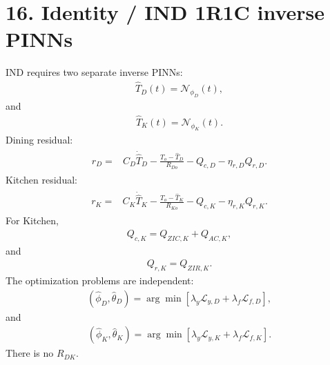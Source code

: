 \documentclass[11pt]{article}
\begin{document}
\section*{16. Identity / IND 1R1C inverse PINNs}
IND requires two separate inverse PINNs:
\begin{align}
\boxed{\widehat T_D(t)=\mathcal N_{\phi_D}(t),}
\tag{P2.66}
\end{align}
and
\begin{align}
\boxed{\widehat T_K(t)=\mathcal N_{\phi_K}(t).}
\tag{P2.67}
\end{align}
Dining residual:
\begin{align}
\boxed{\begin{aligned}
r_D={}&C_D\dot{\widehat T}_D-\frac{T_o-\widehat T_D}{R_{Do}}-Q_{c,D}-\eta_{r,D}Q_{r,D}.
\end{aligned}}
\tag{P2.68}
\end{align}
Kitchen residual:
\begin{align}
\boxed{\begin{aligned}
r_K={}&C_K\dot{\widehat T}_K-\frac{T_o-\widehat T_K}{R_{Ko}}-Q_{c,K}-\eta_{r,K}Q_{r,K}.
\end{aligned}}
\tag{P2.69}
\end{align}
For Kitchen,
\begin{align}
\boxed{Q_{c,K}=Q_{ZIC,K}+Q_{AC,K},}
\tag{P2.70}
\end{align}
and
\begin{align}
\boxed{Q_{r,K}=Q_{ZIR,K}.}
\tag{P2.71}
\end{align}
The optimization problems are independent:
\begin{align}
\boxed{(\widehat\phi_D,\widehat\theta_D)=\arg\min\left[\lambda_y\mathcal L_{y,D}+\lambda_f\mathcal L_{f,D}\right],}
\tag{P2.72}
\end{align}
and
\begin{align}
\boxed{(\widehat\phi_K,\widehat\theta_K)=\arg\min\left[\lambda_y\mathcal L_{y,K}+\lambda_f\mathcal L_{f,K}\right].}
\tag{P2.73}
\end{align}
There is no \(R_{DK}\).
\end{document}
